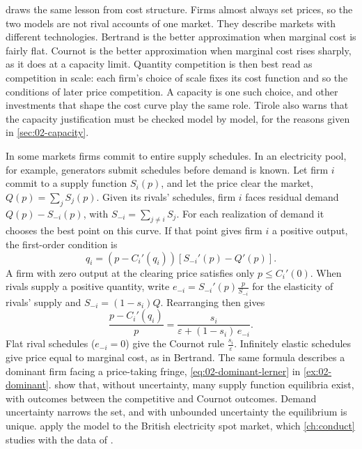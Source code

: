 \citet[sec.~5.6]{Tirole1988} draws the same lesson from cost structure. Firms almost always set prices, so the two
models are not rival accounts of one market. They describe markets with different technologies. Bertrand is the
better approximation when marginal cost is fairly flat. Cournot is the better approximation when marginal cost
rises sharply, as it does at a capacity limit. Quantity competition is then best read as competition in scale: each
firm's choice of scale fixes its cost function and so the conditions of later price competition. A capacity is one
such choice, and other investments that shape the cost curve play the same role. Tirole also warns that the
capacity justification must be checked model by model, for the reasons given in \cref{sec:02-capacity}.

\begin{remark}\label{rem:02-sfe}
In some markets firms commit to entire supply schedules. In an electricity pool, for example, generators submit
schedules before demand is known. Let firm $i$ commit to a supply function $S_i(p)$, and let the price clear the market,
$Q(p) = \sum_j S_j(p)$. Given its rivals' schedules, firm $i$ faces residual demand $Q(p) - S_{-i}(p)$, with
$S_{-i} = \sum_{j \ne i} S_j$. For each realization of demand it chooses the best point on this curve. If that point
gives firm $i$ a positive output, the first-order condition is
\begin{equation*}
q_i = \left(p - C_i'(q_i)\right)\left[S_{-i}'(p) - Q'(p)\right].
\end{equation*}
A firm with zero output at the clearing price satisfies only $p \le C_i'(0)$. When rivals supply a positive quantity,
write $e_{-i} = S_{-i}'(p)\frac{p}{S_{-i}}$ for the elasticity of rivals' supply and $S_{-i} = (1 - s_i)Q$.
Rearranging then gives
\begin{equation*}
\frac{p - C_i'(q_i)}{p} = \frac{s_i}{\varepsilon + (1 - s_i)\, e_{-i}} .
\end{equation*}
Flat rival schedules ($e_{-i} = 0$) give the Cournot rule $\frac{s_i}{\varepsilon}$. Infinitely elastic schedules
give price equal to marginal cost, as in Bertrand. The same formula describes a dominant firm facing a price-taking
fringe, \eqref{eq:02-dominant-lerner} in \cref{ex:02-dominant}. \citet{KlempererMeyer1989} show that, without uncertainty, many supply function
equilibria exist, with outcomes between the competitive and Cournot outcomes. Demand uncertainty narrows the set, and
with unbounded uncertainty the equilibrium is unique. \citet{GreenNewbery1992} apply the model to the British
electricity spot market, which \cref{ch:conduct} studies with the data of \citet{Wolfram1999}.
\end{remark}

